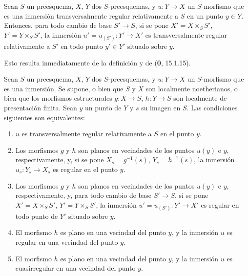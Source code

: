 \begin{proposition}[19.2.3]
\label{IV.19.2.3}
Sean $S$ un preesquema, $X$, $Y$ dos $S$-preesquemas, y $u:Y\to X$ un $S$-morfismo que es una inmersión transversalmente regular relativamente a $S$ en un punto $y\in Y$. Entonces, para todo cambio de base $S'\to S$, si se pone $X'=X\times_S S'$, $Y'=Y\times_S S'$, la inmersión $u'=u_{(S')}:Y'\to X'$ es transversalmente regular relativamente a $S'$ en todo punto $y'\in Y'$ situado sobre $y$.
\end{proposition}

Esto resulta inmediatamente de la definición y de (\textbf{0}, 15.1.15).

\begin{proposition}[19.2.4]
\label{IV.19.2.4}
Sean $S$ un preesquema, $X$, $Y$ dos $S$-preesquemas, y $u:Y\to X$ un $S$-morfismo que es una inmersión. Se supone, \textup{o bien} que $S$ y $X$ son localmente noetherianos, \textup{o bien} que los morfismos estructurales $g:X\to S$, $h:Y\to S$ son localmente de presentación finita. Sean $y$ un punto de $Y$ y $s$ su imagen en $S$. Las condiciones siguientes son equivalentes:
\begin{enumerate}
  \item[\textup{a)}] $u$ es transversalmente regular relativamente a $S$ en el punto $y$.
  \item[\textup{b)}] Los morfismos $g$ y $h$ son planos en vecindades de los puntos $u(y)$ e $y$, respectivamente, y, si se pone $X_s=g^{-1}(s)$, $Y_s=h^{-1}(s)$, la inmersión $u_s:Y_s\to X_s$ es regular en el punto $y$.
  \item[\textup{b$'$)}] Los morfismos $g$ y $h$ son planos en vecindades de los puntos $u(y)$ e $y$, respectivamente, y, para todo cambio de base $S'\to S$, si se pone $X'=X\times_S S'$, $Y'=Y\times_S S'$, la inmersión $u'=u_{(S')}:Y'\to X'$ es regular en todo punto de $Y'$ situado sobre $y$.
  \item[\textup{c)}] El morfismo $h$ es plano en una vecindad del punto $y$, y la inmersión $u$ es regular en una vecindad del punto $y$.


  \item[\textup{c$'$)}] El morfismo $h$ es plano en una vecindad del punto $y$, y la inmersión $u$ es cuasirregular en una vecindad del punto $y$.
\end{enumerate}
\end{proposition}


